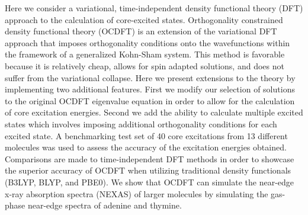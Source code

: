 \documentclass[12pt]{article}
\begin{document}
\noindent \normalsize{Here we consider a variational, time-independent density functional theory (DFT) approach to the calculation of core-excited states. Orthogonality constrained density functional theory (OCDFT) is an extension of the variational DFT approach that imposes orthogonality conditions onto the wavefunctions within the framework of a generalized Kohn-Sham system. This method is favorable because it is relatively cheap, allows for spin adapted solutions, and does not suffer from the variational collapse. Here we present extensions to the theory by implementing two additional features. First we modify our selection of solutions to the original OCDFT eigenvalue equation in order to allow for the calculation of core excitation energies. Second we add the ability to calculate multiple excited states which involves imposing additional orthogonality conditions for each excited state. A benchmarking test set of 40 core excitations from 13 different molecules was used to assess the accuracy of the excitation energies obtained. Comparisons are made to time-independent DFT methods in order to showcase the superior accuracy of OCDFT when utilizing traditional density functionals (B3LYP, BLYP, and PBE0). We show that OCDFT can simulate the near-edge x-ray absorption spectra (NEXAS) of larger molecules by simulating the gas-phase near-edge spectra of adenine and thymine.}

\vspace{0.5cm}
\doublespacing
\end{document}
